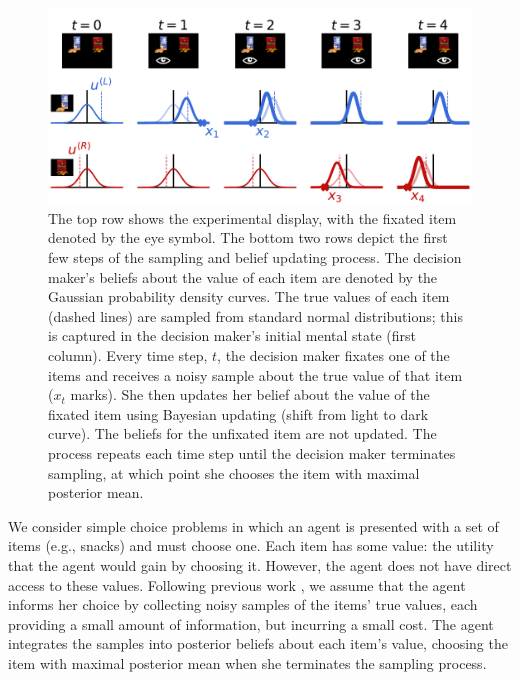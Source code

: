 \begin{figure}[t!]
    \centering
    \includegraphics[width=\textwidth]{figs/attention/Fig1.pdf}
    \caption{ The top row shows the experimental display, with the fixated item denoted by the eye symbol.  The bottom two rows depict the first few steps of the sampling and belief updating process. The decision maker's beliefs about the value of each item are denoted by the Gaussian probability density curves. The true values of each item (dashed lines) are sampled from standard normal distributions; this is captured in the decision maker's initial mental state (first column). Every time step, $t$, the decision maker fixates one of the items and receives a noisy sample about the true value of that item ($x_t$ marks). She then updates her belief about the value of the fixated item using Bayesian updating (shift from light to dark curve). The beliefs for the unfixated item are not updated. The process repeats each time step until the decision maker terminates sampling, at which point she chooses the item with maximal posterior mean.
  }
  \label{fig:attention1}
\end{figure}

 

We consider simple choice problems in which an agent is presented with a set of items (e.g., snacks) and must choose one. Each item has some value: the utility that the agent would gain by choosing it. However, the agent does not have direct access to these values. Following previous work \citep{krajbich2010visual,krajbich2011multialternative,tajima2016optimal,tajima2019optimal,fudenberg2018speed}, we assume that the agent informs her choice by collecting noisy samples of the items' true values, each providing a small amount of information, but incurring a small cost. The agent integrates the samples into posterior beliefs about each item's value, choosing the item with maximal posterior mean when she terminates the sampling process.

